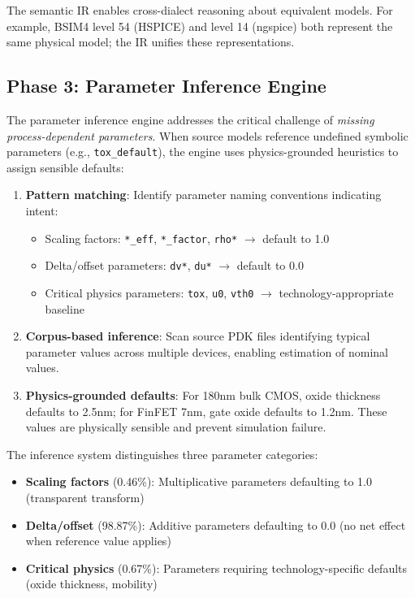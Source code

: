 \documentclass[conference]{IEEEtran}
\begin{document}
The semantic IR enables cross-dialect reasoning about equivalent models. For example, BSIM4 level 54 (HSPICE) and level 14 (ngspice) both represent the same physical model; the IR unifies these representations.

\subsection{Phase 3: Parameter Inference Engine}

The parameter inference engine addresses the critical challenge of \emph{missing process-dependent parameters}. When source models reference undefined symbolic parameters (e.g., \texttt{tox\_default}), the engine uses physics-grounded heuristics to assign sensible defaults:

\begin{enumerate}
\item \textbf{Pattern matching}: Identify parameter naming conventions indicating intent:
    \begin{itemize}
    \item Scaling factors: \texttt{*\_eff}, \texttt{*\_factor}, \texttt{rho*} $\rightarrow$ default to 1.0
    \item Delta/offset parameters: \texttt{dv*}, \texttt{du*} $\rightarrow$ default to 0.0
    \item Critical physics parameters: \texttt{tox}, \texttt{u0}, \texttt{vth0} $\rightarrow$ technology-appropriate baseline
    \end{itemize}

\item \textbf{Corpus-based inference}: Scan source PDK files identifying typical parameter values across multiple devices, enabling estimation of nominal values.

\item \textbf{Physics-grounded defaults}: For 180nm bulk CMOS, oxide thickness defaults to 2.5nm; for FinFET 7nm, gate oxide defaults to 1.2nm. These values are physically sensible and prevent simulation failure.
\end{enumerate}

The inference system distinguishes three parameter categories:
\begin{itemize}
\item \textbf{Scaling factors} (0.46\%): Multiplicative parameters defaulting to 1.0 (transparent transform)
\item \textbf{Delta/offset} (98.87\%): Additive parameters defaulting to 0.0 (no net effect when reference value applies)
\item \textbf{Critical physics} (0.67\%): Parameters requiring technology-specific defaults (oxide thickness, mobility)
\end{itemize}
\end{document}

